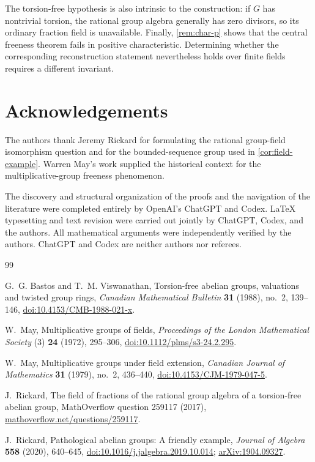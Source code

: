 \documentclass[11pt,a4paper]{article}
\numberwithin{equation}{section}
\theoremstyle{plain}
\theoremstyle{definition}
\theoremstyle{remark}
\begin{document}
The torsion-free hypothesis is also intrinsic to the construction: if $G$
has nontrivial torsion, the rational group algebra generally has zero
divisors, so its ordinary fraction field is unavailable.  Finally,
\cref{rem:char-p} shows that the central freeness theorem fails in positive
characteristic.  Determining whether the corresponding reconstruction
statement nevertheless holds over finite fields requires a different
invariant.

\section*{Acknowledgements}

The authors thank Jeremy Rickard for formulating the rational group-field
isomorphism question and for the bounded-sequence group used in
\cref{cor:field-example}.  Warren May's work supplied the historical context
for the multiplicative-group freeness phenomenon.

The discovery and structural organization of the proofs and the navigation of
the literature were completed entirely by OpenAI's ChatGPT and Codex.  LaTeX
typesetting and text revision were carried out jointly by ChatGPT, Codex, and
the authors.  All mathematical arguments were independently verified by the
authors.  ChatGPT and Codex are neither authors nor referees.

\begingroup
\footnotesize
\begin{thebibliography}{99}
\setlength{\itemsep}{0.2em}

G.~G. Bastos and T.~M. Viswanathan,
\newblock Torsion-free abelian groups, valuations and twisted group rings,
\newblock \emph{Canadian Mathematical Bulletin} \textbf{31} (1988), no.~2,
139--146,
\newblock
\href{https://doi.org/10.4153/CMB-1988-021-x}{doi:10.4153/CMB-1988-021-x}.

W.~May,
\newblock Multiplicative groups of fields,
\newblock \emph{Proceedings of the London Mathematical Society} (3)
\textbf{24} (1972), 295--306,
\newblock
\href{https://doi.org/10.1112/plms/s3-24.2.295}{doi:10.1112/plms/s3-24.2.295}.

W.~May,
\newblock Multiplicative groups under field extension,
\newblock \emph{Canadian Journal of Mathematics} \textbf{31} (1979), no.~2,
436--440,
\newblock
\href{https://doi.org/10.4153/CJM-1979-047-5}{doi:10.4153/CJM-1979-047-5}.

J.~Rickard,
\newblock The field of fractions of the rational group algebra of a
torsion-free abelian group,
\newblock MathOverflow question 259117 (2017),
\newblock
\href{https://mathoverflow.net/questions/259117/}{mathoverflow.net/questions/259117}.

J.~Rickard,
\newblock Pathological abelian groups: A friendly example,
\newblock \emph{Journal of Algebra} \textbf{558} (2020), 640--645,
\newblock
\href{https://doi.org/10.1016/j.jalgebra.2019.10.014}{doi:10.1016/j.jalgebra.2019.10.014};
\newblock
\href{https://arxiv.org/abs/1904.09327}{arXiv:1904.09327}.

\end{thebibliography}
\endgroup
\end{document}
